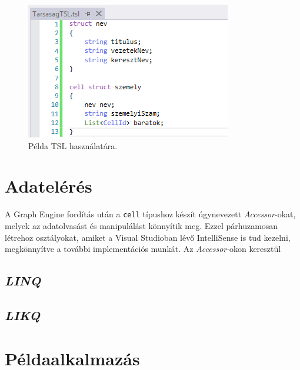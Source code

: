 \begin{figure}[ht!]
	\centering
	\includegraphics[]{figures/TarsasagTSL.png}
	\caption{Példa TSL használatára.}
	\label{fig:TSL}
\end{figure}

\section{Adatelérés}

A Graph Engine fordítás után a \texttt{cell} típushoz készít úgynevezett \emph{Accessor}-okat, melyek az adatolvasást és manipulálást könnyítik meg. Ezzel párhuzamosan létrehoz osztályokat, amiket a Visual Studioban lévő IntelliSense is tud kezelni, megkönnyítve a további implementációs munkát. Az \emph{Accessor}-okon keresztül 

\subsection{\emph{LINQ}}

\subsection{\emph{LIKQ}}

\section{Példaalkalmazás}